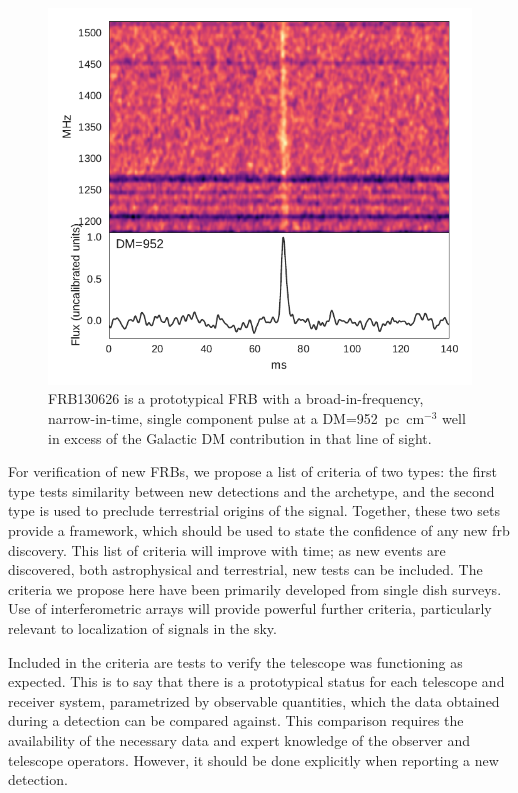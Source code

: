 \documentclass[a4paper,fleqn,usenatbib]{mnras}
\begin{document}
\begin{figure}
    \includegraphics[width=1.0\linewidth]{figures/FRB130626.pdf}
    \caption{FRB130626 is a prototypical FRB with a broad-in-frequency,
    narrow-in-time, single component pulse at a DM=952~pc~cm$^{-3}$ well in
    excess of the Galactic DM contribution in that line of sight.
    }
    \label{fig:FRB130626}
\end{figure}

For verification of new FRBs, we propose a list of criteria of two types: the
first type tests similarity between new detections and the archetype, and the
second type is used to preclude terrestrial origins of the signal. Together,
these two sets provide a framework, which should be used to state the confidence
of any new \gls{frb} discovery. This list of criteria will improve with time; as
new events are discovered, both astrophysical and terrestrial, new tests can be
included. The criteria we propose here have been primarily developed from single
dish surveys.  Use of interferometric arrays will provide powerful further
criteria, particularly relevant to localization of signals in the sky.

Included in the criteria are tests to verify the telescope was functioning as
expected. This is to say that there is a prototypical status for each telescope
and receiver system, parametrized by observable quantities, which the data
obtained during a detection can be compared against.  This comparison requires
the availability of the necessary data and expert knowledge of the observer and
telescope operators. However, it should be done explicitly when reporting a new
detection.
\end{document}
